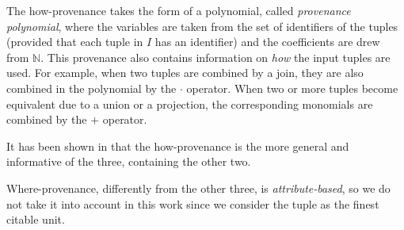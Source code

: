 The how-provenance takes the form of a polynomial, called \emph{provenance polynomial}, where the variables are taken from the set of identifiers of the tuples (provided that each tuple in $I$ has an identifier) and the coefficients are drew from $\mathbb{N}$. 
This provenance also contains information on \emph{how} the input tuples are used. For example, when two tuples are combined by a join, they are also combined in the polynomial by the $\cdot$ operator. When two or more tuples become equivalent due to a union or a projection, the corresponding monomials are combined by the $+$ operator.

It has been shown in \citep{CheneyProvSurvey} that the how-provenance is the more general and informative of the three, containing the other two.

Where-provenance, differently from the other three, is \emph{attribute-based}, so we do not take it into account in this work since we consider the tuple as the finest citable unit. 
